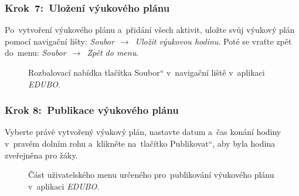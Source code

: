 \documentclass[male,czech,api_bc]{kitheses}
\begin{document}
\subsubsection{Krok~7:~Uložení výukového plánu}
Po~vytvoření výukového plánu a~přidání všech aktivit, uložte svůj výukový plán pomocí navigační lišty: \textit{Soubor}~$\rightarrow$~\textit{Uložit výukovou hodinu}. Poté se vraťte zpět do~menu: \textit{Soubor}~$\rightarrow$~\textit{Zpět do menu}.

\begin{figure}[H]
	\centering
	\caption{Rozbalovací nabídka tlačítka \quotedblbase Soubor`` v~navigační liště v~aplikaci \textit{EDUBO}.}
	\label{fig:manual-3}
\end{figure}

\subsubsection{Krok 8:~Publikace výukového plánu}
Vyberte právě vytvořený výukový plán, nastavte datum a~čas konání hodiny v~pravém dolním rohu a~klikněte na~tlačítko \quotedblbase Publikovat``, aby byla hodina zveřejněna pro žáky.

\begin{figure}[H]
	\centering
	\caption{Část uživatelského menu určeného pro~publikování výukového plánu v~aplikaci \textit{EDUBO}.}
	\label{fig:manual-4}
\end{figure}
\end{document}
